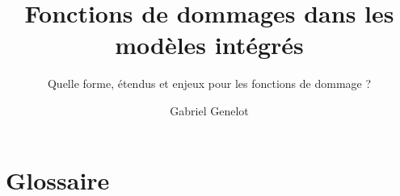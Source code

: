 \documentclass{layout/epfl-report}
\begin{document}





\frontmatter

\title{Fonctions de dommages dans les modèles intégrés}
\subtitle{Quelle forme, étendus et enjeux pour les fonctions de dommage ?}
\author{Gabriel Genelot}

\subject{\textit{Mémoire de recherche}} %
\affiliation{} %

\makecover




%

\tableofcontents



%


\mainmatter











\setcounter{biburlnumpenalty}{7000}
\setcounter{biburllcpenalty}{7000}
\setcounter{biburlucpenalty}{7000}




\appendix

\renewcommand{\chaptername}{Annexe}
\newrefsegment


\chapter{Glossaire}
\begin{multicols}{2}
    \printglossary[title=]
\end{multicols}
\end{document}
